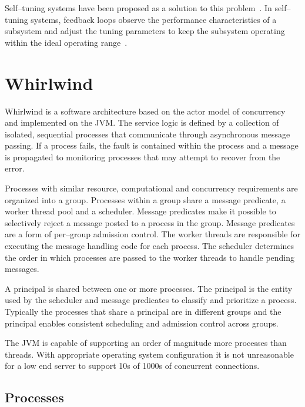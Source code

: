 \documentclass[conference]{IEEEtran}
\begin{document}
Self--tuning systems have been proposed as a solution to this problem~\cite{Kephart03AutonomicVision}. In self--tuning systems, feedback loops observe the performance characteristics of a subsystem and adjust the tuning parameters to keep the subsystem operating within the ideal operating range~\cite{welsh03Adaptive,Heiss:91:AdaptiveLoadControl}.

\section{Whirlwind}

Whirlwind is a software architecture based on the actor model of concurrency and implemented on the JVM. The service logic is defined by a collection of isolated, sequential processes that communicate through asynchronous message passing. If a process fails, the fault is contained within the process and a message is propagated to monitoring processes that may attempt to recover from the error.

Processes with similar resource, computational and concurrency requirements are organized into a group. Processes within a group share a message predicate, a worker thread pool and a scheduler. Message predicates make it possible to selectively reject a message posted to a process in the group. Message predicates are a form of per--group admission control. The worker threads are responsible for executing the message handling code for each process. The scheduler determines the order in which processes are passed to the worker threads to handle pending messages.

A principal is shared between one or more processes. The principal is the entity used by the scheduler and message predicates to classify and prioritize a process. Typically the processes that share a principal are in different groups and the principal enables consistent scheduling and admission control across groups.


The JVM is capable of supporting an order of magnitude more processes than threads. With appropriate operating system configuration it is not unreasonable for a low end server to support 10s of 1000s of concurrent connections.

\subsection{Processes}
\label{section:Processes}
\end{document}
